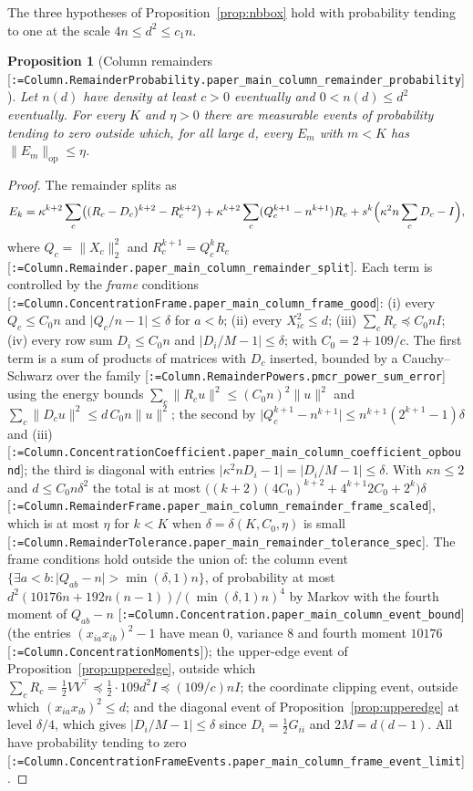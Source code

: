 \documentclass[11pt]{article}
\makeatletter
\newcommand{\formal@break}[1]{\@tfor\formal@tok:=#1\do{%
  \formal@tok
  \expandafter\ifx\formal@tok.\allowbreak\else
  \expandafter\ifx\formal@tok\_\allowbreak\fi\fi}}
\DeclareRobustCommand{\formal}[1]{\textnormal{[\texttt{\small\formal@break{#1}}]}}
\newcommand{\norm}[1]{\lVert #1\rVert}
\newcommand{\abs}[1]{\lvert #1\rvert}
\newcommand{\op}{\mathrm{op}}
\newcommand{\Id}{I}
\theoremstyle{plain}
\newtheorem{proposition}[theorem]{Proposition}
\theoremstyle{definition}
\makeatother
\begin{document}
The three hypotheses of Proposition~\ref{prop:nbbox} hold with probability
tending to one at the scale $4n \le d^2 \le c_1n$.

\begin{proposition}[Column remainders \formal{Column.RemainderProbability.paper\_main\_column\_remainder\_probability}]\label{prop:remainders}
Let $n(d)$ have density at least $c > 0$ eventually and $0 < n(d) \le d^2$
eventually. For every $K$ and $\eta > 0$ there are measurable events of
probability tending to zero outside which, for all large $d$, every $E_m$
with $m < K$ has $\norm{E_m}_\op \le \eta$.
\end{proposition}

\begin{proof}
The remainder splits as
\[
E_k = \kappa^{k+2}\sum_c\bigl((R_c - D_c)^{k+2} - R_c^{k+2}\bigr) + \kappa^{k+2}\sum_c(Q_c^{k+1} - n^{k+1})R_c + s^k\Bigl(\kappa^2n\sum_cD_c - \Id\Bigr),
\]
where $Q_c = \norm{X_c}_2^2$ and $R_c^{k+1} = Q_c^kR_c$
\formal{Column.Remainder.paper\_main\_column\_remainder\_split}. Each term is
controlled by the \emph{frame} conditions
\formal{Column.ConcentrationFrame.paper\_main\_column\_frame\_good}:
(i) every $Q_c \le C_0n$ and $\abs{Q_c/n - 1} \le \delta$ for $a < b$;
(ii) every $X_{ic}^2 \le d$; (iii) $\sum_cR_c \preceq C_0n\Id$;
(iv) every row sum $D_i \le C_0n$ and $\abs{D_i/M - 1} \le \delta$;
with $C_0 = 2 + 109/c$. The first term is a sum of products of matrices
with $D_c$ inserted, bounded by a Cauchy--Schwarz over the family
\formal{Column.RemainderPowers.pmcr\_power\_sum\_error} using the energy
bounds $\sum_c\norm{R_cu}^2 \le (C_0n)^2\norm{u}^2$ and
$\sum_c\norm{D_cu}^2 \le d\,C_0n\norm{u}^2$; the second by
$\abs{Q_c^{k+1} - n^{k+1}} \le n^{k+1}(2^{k+1} - 1)\delta$ and (iii)
\formal{Column.ConcentrationCoefficient.paper\_main\_column\_coefficient\_opbound};
the third is diagonal with entries $\abs{\kappa^2nD_i - 1} = \abs{D_i/M - 1} \le \delta$.
With $\kappa n \le 2$ and $d \le C_0n\delta^2$ the total is at most
$\bigl((k+2)(4C_0)^{k+2} + 4^{k+1}2C_0 + 2^k\bigr)\delta$
\formal{Column.RemainderFrame.paper\_main\_column\_remainder\_frame\_scaled},
which is at most $\eta$ for $k < K$ when $\delta = \delta(K, C_0, \eta)$ is
small \formal{Column.RemainderTolerance.paper\_main\_remainder\_tolerance\_spec}.
The frame conditions hold outside the union of: the column event
$\{\exists a < b : \abs{Q_{ab} - n} > \min(\delta,1)n\}$, of probability at
most $d^2(10176n + 192n(n-1))/(\min(\delta,1)n)^4$ by Markov with the fourth
moment of $Q_{ab} - n$ \formal{Column.Concentration.paper\_main\_column\_event\_bound}
(the entries $(x_{ia}x_{ib})^2 - 1$ have mean $0$, variance $8$ and fourth
moment $10176$ \formal{Column.ConcentrationMoments}); the upper-edge event
of Proposition~\ref{prop:upperedge}, outside which $\sum_cR_c = \frac12VV^{\top} \preceq \frac12\cdot109d^2\Id \preceq (109/c)n\Id$;
the coordinate clipping event, outside which $(x_{ia}x_{ib})^2 \le d$; and
the diagonal event of Proposition~\ref{prop:upperedge} at level
$\delta/4$, which gives $\abs{D_i/M - 1} \le \delta$ since $D_i = \frac12G_{ii}$
and $2M = d(d-1)$. All have probability tending to zero
\formal{Column.ConcentrationFrameEvents.paper\_main\_column\_frame\_event\_limit}.
\end{proof}
\end{document}
